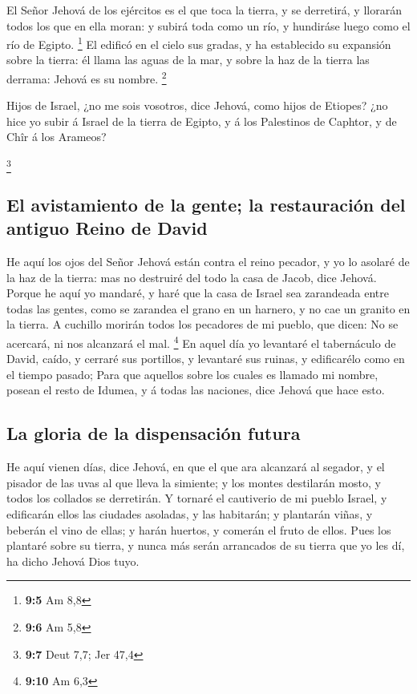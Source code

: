  El Señor Jehová de los ejércitos es el que toca la
tierra, y se derretirá, y llorarán todos los que en ella moran: y subirá
toda como un río, y hundiráse luego como el río de Egipto. \footnote{\textbf{9:5}
  Am 8,8}  El edificó en el cielo sus gradas, y ha
establecido su expansión sobre la tierra: él llama las aguas de la mar,
y sobre la haz de la tierra las derrama: Jehová es su nombre.
\footnote{\textbf{9:6} Am 5,8}

 Hijos de Israel, ¿no me sois vosotros, dice Jehová, como
hijos de Etiopes? ¿no hice yo subir á Israel de la tierra de Egipto, y á
los Palestinos de Caphtor, y de Chîr á los Arameos?

\footnote{\textbf{9:7} Deut 7,7; Jer 47,4}

\hypertarget{el-avistamiento-de-la-gente-la-restauraciuxf3n-del-antiguo-reino-de-david}{%
\subsection{El avistamiento de la gente; la restauración del antiguo
Reino de
David}\label{el-avistamiento-de-la-gente-la-restauraciuxf3n-del-antiguo-reino-de-david}}

 He aquí los ojos del Señor Jehová están contra el reino
pecador, y yo lo asolaré de la haz de la tierra: mas no destruiré del
todo la casa de Jacob, dice Jehová.  Porque he aquí yo
mandaré, y haré que la casa de Israel sea zarandeada entre todas las
gentes, como se zarandea el grano en un harnero, y no cae un granito en
la tierra.  A cuchillo morirán todos los pecadores de mi
pueblo, que dicen: No se acercará, ni nos alcanzará el mal. \footnote{\textbf{9:10}
  Am 6,3}  En aquel día yo levantaré el tabernáculo de
David, caído, y cerraré sus portillos, y levantaré sus ruinas, y
edificarélo como en el tiempo pasado;  Para que aquellos
sobre los cuales es llamado mi nombre, posean el resto de Idumea, y á
todas las naciones, dice Jehová que hace esto.

\hypertarget{la-gloria-de-la-dispensaciuxf3n-futura}{%
\subsection{La gloria de la dispensación
futura}\label{la-gloria-de-la-dispensaciuxf3n-futura}}

 He aquí vienen días, dice Jehová, en que el que ara
alcanzará al segador, y el pisador de las uvas al que lleva la simiente;
y los montes destilarán mosto, y todos los collados se derretirán.
 Y tornaré el cautiverio de mi pueblo Israel, y
edificarán ellos las ciudades asoladas, y las habitarán; y plantarán
viñas, y beberán el vino de ellas; y harán huertos, y comerán el fruto
de ellos.  Pues los plantaré sobre su tierra, y nunca más
serán arrancados de su tierra que yo les dí, ha dicho Jehová Dios tuyo.
